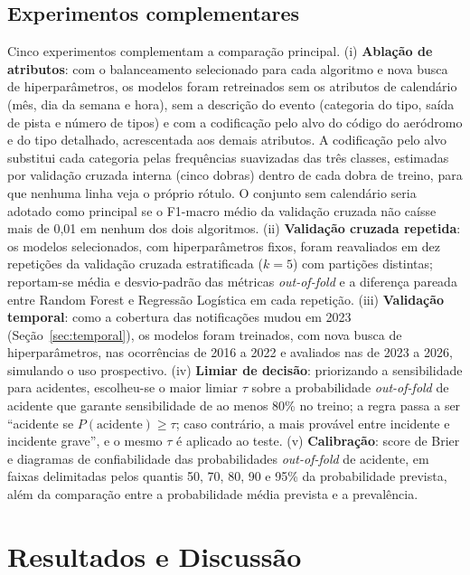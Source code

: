 \documentclass[12pt]{article}
\begin{document}
    \subsection{Experimentos complementares}
    \label{sec:complementares}

    Cinco experimentos complementam a comparação principal. (i) \textbf{Ablação de atributos}: com o balanceamento selecionado para cada algoritmo e nova busca de hiperparâmetros, os modelos foram retreinados sem os atributos de calendário (mês, dia da semana e hora), sem a descrição do evento (categoria do tipo, saída de pista e número de tipos) e com a codificação pelo alvo \cite{micci:2001} do código do aeródromo e do tipo detalhado, acrescentada aos demais atributos. A codificação pelo alvo substitui cada categoria pelas frequências suavizadas das três classes, estimadas por validação cruzada interna (cinco dobras) dentro de cada dobra de treino, para que nenhuma linha veja o próprio rótulo. O conjunto sem calendário seria adotado como principal se o F1-macro médio da validação cruzada não caísse mais de 0,01 em nenhum dos dois algoritmos. (ii) \textbf{Validação cruzada repetida}: os modelos selecionados, com hiperparâmetros fixos, foram reavaliados em dez repetições da validação cruzada estratificada ($k = 5$) com partições distintas; reportam-se média e desvio-padrão das métricas \textit{out-of-fold} e a diferença pareada entre Random Forest e Regressão Logística em cada repetição. (iii) \textbf{Validação temporal}: como a cobertura das notificações mudou em 2023 (Seção~\ref{sec:temporal}), os modelos foram treinados, com nova busca de hiperparâmetros, nas ocorrências de 2016 a 2022 e avaliados nas de 2023 a 2026, simulando o uso prospectivo. (iv) \textbf{Limiar de decisão}: priorizando a sensibilidade para acidentes, escolheu-se o maior limiar $\tau$ sobre a probabilidade \textit{out-of-fold} de acidente que garante sensibilidade de ao menos 80\% no treino; a regra passa a ser ``acidente se $P(\text{acidente}) \geq \tau$; caso contrário, a mais provável entre incidente e incidente grave'', e o mesmo $\tau$ é aplicado ao teste. (v) \textbf{Calibração}: score de Brier e diagramas de confiabilidade das probabilidades \textit{out-of-fold} de acidente, em faixas delimitadas pelos quantis 50, 70, 80, 90 e 95\% da probabilidade prevista, além da comparação entre a probabilidade média prevista e a prevalência.

\section{Resultados e Discussão}
\label{sec:resultados}
\end{document}
